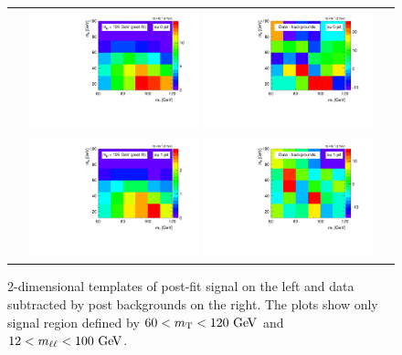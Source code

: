 \begin{figure}[htp] 
\centering 
\begin{tabular}{c} 
\includegraphics[width=0.45\textwidth]{figures/2d_postfit_0j_125_sig_paper.pdf}          
\includegraphics[width=0.45\textwidth]{figures/2d_postfit_0j_125_dataminusbkg_paper.pdf}          
\\
\includegraphics[width=0.45\textwidth]{figures/2d_postfit_1j_125_sig_paper.pdf}          
\includegraphics[width=0.45\textwidth]{figures/2d_postfit_1j_125_dataminusbkg_paper.pdf}          
\end{tabular} 
\caption{2-dimensional templates of post-fit signal on the left 
and data subtracted by post backgrounds on the right. 
The plots show only signal region defined by $60<m_{\mathrm{T}}<120~\mathrm{Ge\kern -0.1em V}$ and $12<m_{\ell\ell}<100~\mathrm{Ge\kern -0.1em V}$.}
\label{fig:post2D} 
\end{figure} 


